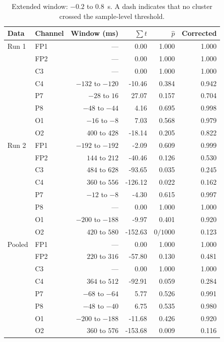 \documentclass[11pt,a4paper]{article}
\begin{document}
\begin{table}[!htbp]
\centering
\caption{Extended window: $-0.2$ to $0.8$~s. A dash indicates that no cluster crossed the sample-level threshold.}
\begin{tabular}{llrrrr}
\toprule
Data & Channel & Window (ms) & $\sum t$ & $\hat p$ & Corrected \\
\midrule
Run 1 & FP1 & --- & 0.00 & 1.000 & 1.000 \\
 & FP2 & --- & 0.00 & 1.000 & 1.000 \\
 & C3 & --- & 0.00 & 1.000 & 1.000 \\
 & C4 & $-132$ to $-120$ & -10.46 & 0.384 & 0.942 \\
 & P7 & $-28$ to $16$ & 27.07 & 0.157 & 0.704 \\
 & P8 & $-48$ to $-44$ & 4.16 & 0.695 & 0.998 \\
 & O1 & $-16$ to $-8$ & 7.03 & 0.568 & 0.979 \\
 & O2 & $400$ to $428$ & -18.14 & 0.205 & 0.822 \\
\addlinespace[5pt]
Run 2 & FP1 & $-192$ to $-192$ & -2.09 & 0.609 & 0.999 \\
 & FP2 & $144$ to $212$ & -40.46 & 0.126 & 0.530 \\
 & C3 & $484$ to $628$ & -93.65 & 0.035 & 0.245 \\
 & C4 & $360$ to $556$ & -126.12 & 0.022 & 0.162 \\
 & P7 & $-12$ to $-8$ & -4.30 & 0.615 & 0.997 \\
 & P8 & --- & 0.00 & 1.000 & 1.000 \\
 & O1 & $-200$ to $-188$ & -9.97 & 0.401 & 0.920 \\
 & O2 & $420$ to $580$ & -152.63 & $0/1000$ & 0.123 \\
\addlinespace[5pt]
Pooled & FP1 & --- & 0.00 & 1.000 & 1.000 \\
 & FP2 & $220$ to $316$ & -57.80 & 0.130 & 0.481 \\
 & C3 & --- & 0.00 & 1.000 & 1.000 \\
 & C4 & $364$ to $512$ & -92.91 & 0.059 & 0.284 \\
 & P7 & $-68$ to $-64$ & 5.77 & 0.526 & 0.991 \\
 & P8 & $-48$ to $-40$ & 6.75 & 0.535 & 0.980 \\
 & O1 & $-200$ to $-188$ & -11.68 & 0.426 & 0.920 \\
 & O2 & $360$ to $576$ & -153.68 & 0.009 & 0.116 \\
\bottomrule
\end{tabular}
\end{table}
\end{document}
